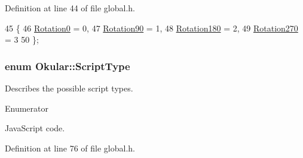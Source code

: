 Definition at line 44 of file global.\+h.


\begin{DoxyCode}
45 \{
46     \hyperlink{namespaceOkular_a8556d00465f61ef533c6b027669e7da6aa4df8fc3dd09e30520c264c8d23d89c2}{Rotation0} = 0,    
47     \hyperlink{namespaceOkular_a8556d00465f61ef533c6b027669e7da6a72f281f9a68957920dc968695de4363a}{Rotation90} = 1,   
48     \hyperlink{namespaceOkular_a8556d00465f61ef533c6b027669e7da6a95c9d62f7745cb6bf5895007070e8ee9}{Rotation180} = 2,  
49     \hyperlink{namespaceOkular_a8556d00465f61ef533c6b027669e7da6a01963dd547f5723a6b3975ae67090390}{Rotation270} = 3   
50 \};
\end{DoxyCode}
\hypertarget{namespaceOkular_a061f34ff835b2d2142fef28bcfd09325}{
\subsubsection[{Script\+Type}]{\setlength{\rightskip}{0pt plus 5cm}enum {\bf Okular\+::\+Script\+Type}}}\label{namespaceOkular_a061f34ff835b2d2142fef28bcfd09325}
Describes the possible script types. \begin{Desc}
\item[Enumerator]\par
\begin{description}
\item[{\em 
\hypertarget{namespaceOkular_a061f34ff835b2d2142fef28bcfd09325ac61eb96a387ac39266f6eb71948796ea}{Java\+Script}\label{namespaceOkular_a061f34ff835b2d2142fef28bcfd09325ac61eb96a387ac39266f6eb71948796ea}
}]Java\+Script code. \end{description}
\end{Desc}


Definition at line 76 of file global.\+h.


